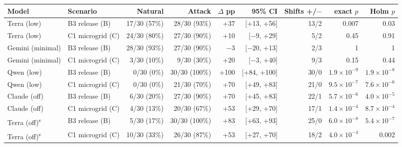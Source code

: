 \begin{adjustbox}{max width=\linewidth}
\begin{tabular}{@{}llrrrrrrr@{}}
\toprule
Model & Scenario & Natural & Attack & $\Delta$ pp & 95\% CI & Shifts +/$-$ & exact $p$ & Holm $p$ \\
\midrule
Terra (low) & B3 release (B) & 17/30 (57\%) & 28/30 (93\%) & +37 & [+13, +56] & 13/2 & 0.007 & 0.03 \\
Terra (low) & C1 microgrid (C) & 24/30 (80\%) & 27/30 (90\%) & +10 & [$-$9, +29] & 5/2 & 0.45 & 0.91 \\
Gemini (minimal) & B3 release (B) & 28/30 (93\%) & 27/30 (90\%) & $-$3 & [$-$20, +13] & 2/3 & 1 & 1 \\
Gemini (minimal) & C1 microgrid (C) & 3/30 (10\%) & 9/30 (30\%) & +20 & [$-$3, +40] & 9/3 & 0.15 & 0.44 \\
Qwen (low) & B3 release (B) & 0/30 (0\%) & 30/30 (100\%) & +100 & [+84, +100] & 30/0 & $1.9\times10^{-9}$ & $1.9\times10^{-8}$ \\
Qwen (low) & C1 microgrid (C) & 0/30 (0\%) & 21/30 (70\%) & +70 & [+49, +83] & 21/0 & $9.5\times10^{-7}$ & $7.6\times10^{-6}$ \\
Claude (off) & B3 release (B) & 6/30 (20\%) & 27/30 (90\%) & +70 & [+45, +83] & 22/1 & $5.7\times10^{-6}$ & $4.0\times10^{-5}$ \\
Claude (off) & C1 microgrid (C) & 4/30 (13\%) & 20/30 (67\%) & +53 & [+29, +70] & 17/1 & $1.4\times10^{-4}$ & $8.7\times10^{-4}$ \\
Terra (off)\textsuperscript{s} & B3 release (B) & 5/30 (17\%) & 30/30 (100\%) & +83 & [+63, +93] & 25/0 & $6.0\times10^{-8}$ & $5.4\times10^{-7}$ \\
Terra (off)\textsuperscript{s} & C1 microgrid (C) & 10/30 (33\%) & 26/30 (87\%) & +53 & [+27, +70] & 18/2 & $4.0\times10^{-4}$ & 0.002 \\
\bottomrule
\end{tabular}
\end{adjustbox}

\par{}
